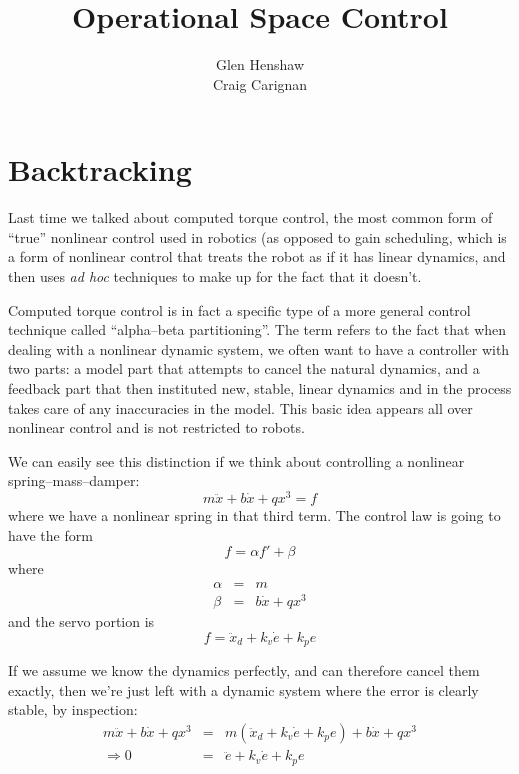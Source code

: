 \documentclass[]{article}
\title{Operational Space Control}
\author{Glen Henshaw\\Craig Carignan}
\begin{document}
\maketitle

\section{Backtracking}
Last time we talked about computed torque control, the most common form of ``true'' nonlinear control used in robotics (as opposed to gain scheduling, which is a form of nonlinear control that treats the robot as if it has linear dynamics, and then uses \textit{ad hoc} techniques to make up for the fact that it doesn't.

Computed torque control is in fact a specific type of a more general control technique called ``alpha--beta partitioning''. The term refers to the fact that when dealing with a nonlinear dynamic system, we often want to have a controller with two parts: a model part that attempts to cancel the natural dynamics, and a feedback part that then instituted new, stable, linear dynamics and in the process takes care of any inaccuracies in the model. This basic idea appears all over nonlinear control and is not restricted to robots.

We can easily see this distinction if we think about controlling a nonlinear spring--mass--damper:
\begin{equation}
 m\ddot{x}+b\dot{x}+qx^{3} = f
\end{equation}
where we have a nonlinear spring in that third term. The control law is going to have the form
\begin{displaymath}
 f = \alpha f' + \beta
\end{displaymath}
where
\begin{eqnarray}
 \alpha & = & m \nonumber \\
 \beta & = & b\dot{x} + qx^{3} \nonumber
\end{eqnarray}
and the servo portion is
\begin{displaymath}
 f = \ddot{x}_{d} + k_{v}\dot{e}+k_{p}e
\end{displaymath}

If we assume we know the dynamics perfectly, and can therefore cancel them exactly, then we're just left with a dynamic system where the error is clearly stable, by inspection:
\begin{eqnarray}
  m\ddot{x}+b\dot{x}+qx^{3} & = & m\left(\ddot{x}_{d} + k_{v}\dot{e}+k_{p}e\right) +b\dot{x}+qx^{3} \nonumber \\
  \Rightarrow 0 & = & \ddot{e} + k_{v}\dot{e} + k_{p}e \nonumber
\end{eqnarray}
\end{document}
